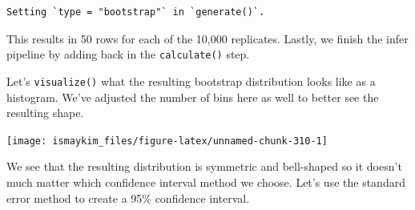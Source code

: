 \documentclass[12pt, krantz2,]{krantz}
\makeatletter
\newenvironment{Shaded}{\begin{snugshade}}{\end{snugshade}}
\newcommand{\DataTypeTok}[1]{\textcolor[rgb]{0.27,0.27,0.27}{#1}}
\newcommand{\DecValTok}[1]{\textcolor[rgb]{0.06,0.06,0.06}{#1}}
\newcommand{\FloatTok}[1]{\textcolor[rgb]{0.06,0.06,0.06}{#1}}
\newcommand{\KeywordTok}[1]{\textcolor[rgb]{0.27,0.27,0.27}{\textbf{#1}}}
\newcommand{\NormalTok}[1]{#1}
\newcommand{\OperatorTok}[1]{\textcolor[rgb]{0.43,0.43,0.43}{\textbf{#1}}}
\newcommand{\OtherTok}[1]{\textcolor[rgb]{0.37,0.37,0.37}{#1}}
\newcommand{\StringTok}[1]{\textcolor[rgb]{0.5,0.5,0.5}{#1}}
\newenvironment{kframe}{%
\medskip{}
\setlength{\fboxsep}{.8em}
 \def\at@end@of@kframe{}%
 \ifinner\ifhmode%
  \def\at@end@of@kframe{\end{minipage}}%
  \begin{minipage}{\columnwidth}%
 \fi\fi%
 \def\FrameCommand##1{\hskip\@totalleftmargin \hskip-\fboxsep
 \colorbox{shadecolor}{##1}\hskip-\fboxsep
     \hskip-\linewidth \hskip-\@totalleftmargin \hskip\columnwidth}%
 \MakeFramed {\advance\hsize-\width
   \@totalleftmargin\z@ \linewidth\hsize
   \@setminipage}}%
 {\par\unskip\endMakeFramed%
 \at@end@of@kframe}
\renewenvironment{Shaded}{\begin{kframe}}{\end{kframe}}
\makeatother
\begin{document}
\begin{verbatim}
Setting `type = "bootstrap"` in `generate()`.
\end{verbatim}

This results in 50 rows for each of the 10,000 replicates. Lastly, we finish the infer pipeline by adding back in the \texttt{calculate()} step.

\begin{Shaded}
\end{Shaded}

Let's \texttt{visualize()} what the resulting bootstrap distribution looks like as a histogram. We've adjusted the number of bins here as well to better see the resulting shape.

\begin{Shaded}
\end{Shaded}

\begin{center}\texttt{[image: ismaykim\_files/figure-latex/unnamed-chunk-310-1]} \end{center}

We see that the resulting distribution is symmetric and bell-shaped so it doesn't much matter which confidence interval method we choose. Let's use the standard error method to create a 95\% confidence interval.

\begin{Shaded}
\end{Shaded}
\end{document}

